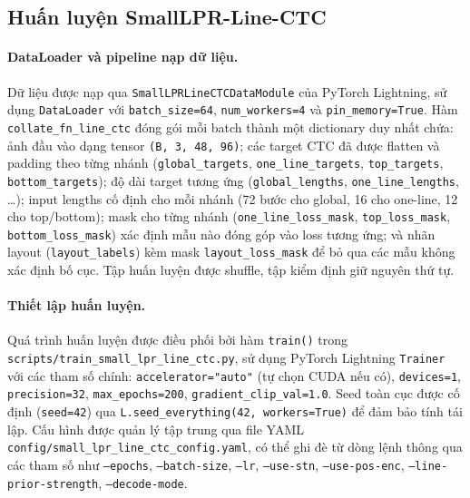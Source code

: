 \documentclass[../DoAn.tex]{subfiles}
\begin{document}
\subsection{Huấn luyện SmallLPR-Line-CTC}
\label{subsection:4.2.4_ocr}

\paragraph{DataLoader và pipeline nạp dữ liệu.}
Dữ liệu được nạp qua \texttt{SmallLPRLineCTCDataModule} của PyTorch Lightning, sử dụng \texttt{DataLoader} với \texttt{batch\_size=64}, \texttt{num\_workers=4} và \texttt{pin\_memory=True}. Hàm \texttt{collate\_fn\_line\_ctc} đóng gói mỗi batch thành một dictionary duy nhất chứa: ảnh đầu vào dạng tensor \texttt{(B, 3, 48, 96)}; các target CTC đã được flatten và padding theo từng nhánh (\texttt{global\_targets}, \texttt{one\_line\_targets}, \texttt{top\_targets}, \texttt{bottom\_targets}); độ dài target tương ứng (\texttt{global\_lengths}, \texttt{one\_line\_lengths}, \dots); input lengths cố định cho mỗi nhánh (72 bước cho global, 16 cho one-line, 12 cho top/bottom); mask cho từng nhánh (\texttt{one\_line\_loss\_mask}, \texttt{top\_loss\_mask}, \texttt{bottom\_loss\_mask}) xác định mẫu nào đóng góp vào loss tương ứng; và nhãn layout (\texttt{layout\_labels}) kèm mask \texttt{layout\_loss\_mask} để bỏ qua các mẫu không xác định bố cục. Tập huấn luyện được shuffle, tập kiểm định giữ nguyên thứ tự.

\paragraph{Thiết lập huấn luyện.}
Quá trình huấn luyện được điều phối bởi hàm \texttt{train()} trong \texttt{scripts/train\_small\_lpr\_line\_ctc.py}, sử dụng PyTorch Lightning \texttt{Trainer} với các tham số chính: \texttt{accelerator="auto"} (tự chọn CUDA nếu có), \texttt{devices=1}, \texttt{precision=32}, \texttt{max\_epochs=200}, \texttt{gradient\_clip\_val=1.0}. Seed toàn cục được cố định (\texttt{seed=42}) qua \texttt{L.seed\_everything(42, workers=True)} để đảm bảo tính tái lập. Cấu hình được quản lý tập trung qua file YAML \texttt{config/small\_lpr\_line\_ctc\_config.yaml}, có thể ghi đè từ dòng lệnh thông qua các tham số như \texttt{--epochs}, \texttt{--batch-size}, \texttt{--lr}, \texttt{--use-stn}, \texttt{--use-pos-enc}, \texttt{--line-prior-strength}, \texttt{--decode-mode}.
\end{document}
